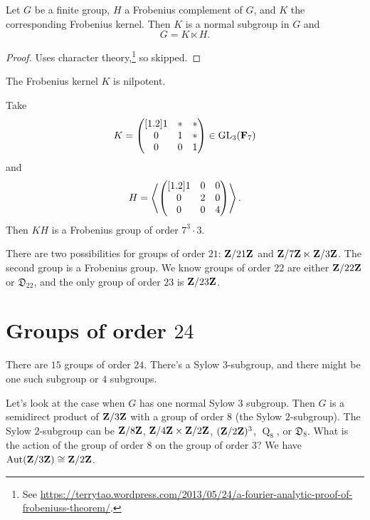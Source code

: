 \documentclass[11pt, twoside]{amsart}
\begin{document}
\begin{theorem}[Frobenius]\label{frob}
Let $G$ be a finite group, $H$ a Frobenius complement of $G$, and $K$ the corresponding Frobenius kernel. Then $K$ is a normal subgroup in $G$ and 
$$
G = K\ltimes H.
$$
\end{theorem}

\begin{proof}
Uses character theory,\footnote{See \url{https://terrytao.wordpress.com/2013/05/24/a-fourier-analytic-proof-of-frobeniuss-theorem/}.} so skipped.
\end{proof}

\begin{theorem}[Thompson]\label{thom}
The Frobenius kernel $K$ is nilpotent.
\end{theorem}
\begin{example}
Take 
$$
K = \begin{pmatrix} [1.2]  1 & * & * \\ 0 &1 &*\\ 0&0&1\end{pmatrix} \in \operatorname{GL}_3({\mathbf F_7})
$$
and 
$$
H = \left \langle \begin{pmatrix} [1.2]  1 & 0&0  \\ 0 &2 &0\\ 0&0&4\end{pmatrix}\right \rangle .
$$
Then $KH $ is a Frobenius group of order $7^3\cdot 3$.
\end{example}

There are two possibilities for groups of order $21$: $\mathbf{Z}/21\mathbf{Z}$ and $\mathbf{Z}/7\mathbf{Z}\ltimes \mathbf{Z}/3\mathbf{Z}$. The second group is a Frobenius group. We know groups of order $22$ are either $\mathbf{Z}/22\mathbf{Z}$ or $\mathfrak{D}_{22}$, and the only group of order $23$ is $\mathbf{Z}/23\mathbf{Z}$.

\section{Groups of order $24$}
There are $15$ groups of order $24$. There's a Sylow $3$-subgroup, and there might be one such subgroup or $4$ subgroups. 

Let's look at the case when $G$ has one normal Sylow $3$ subgroup. Then $G$ is a semidirect product of $\mathbf{Z}/3\mathbf{Z} $ with a group of order $8$ (the Sylow $2$-subgroup). The Sylow $2$-subgroup can be $\mathbf{Z}/8\mathbf{Z} $, $\mathbf{Z}/4\mathbf{Z} \times \mathbf{Z}/2\mathbf{Z} $, $(\mathbf{Z}/2\mathbf{Z} )^3$, $\operatorname{Q}_8 $, or $\mathfrak{D}_8$. What is the action of the group of order $8$ on the group of order $3$? We have $\operatorname{Aut}(\mathbf{Z}/3\mathbf{Z} ) \cong \mathbf{Z}/2\mathbf{Z} $. 
\end{document}

